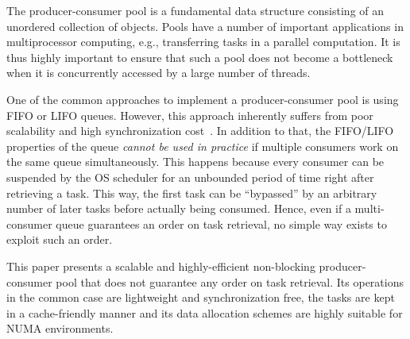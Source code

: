 The producer-consumer pool is a fundamental data structure consisting of an unordered collection of objects. Pools have a number of important
applications in multiprocessor computing, e.g., transferring tasks in a parallel computation. 
It is thus highly important to ensure that such a pool does not become a bottleneck when it is concurrently accessed 
by a large number of threads. 

One of the common approaches to implement a producer-consumer pool is using FIFO or LIFO queues. 
However, this approach inherently suffers from poor scalability and high synchronization cost~\cite{Afek:2010:SPP:1885276.1885295,Basin:2011:CST:2075029.2075087,Sundell:2011:LAC:1989493.1989550}. 
In addition to that, the FIFO/LIFO properties of the queue \emph{cannot be used in practice} if multiple consumers
work on the same queue simultaneously.
This happens because every consumer can be suspended by the OS scheduler for an unbounded period of time right after retrieving a task.
This way, the first task can be ``bypassed'' by an arbitrary number of later tasks before actually being consumed. 
Hence, even if a multi-consumer queue guarantees an order on task retrieval, no simple way exists to exploit such an order. 

This paper presents a scalable and highly-efficient non-blocking producer-consumer pool that does not guarantee any order on task retrieval.
Its operations in the common case are lightweight and synchronization free, the tasks are kept in a cache-friendly manner and its data allocation schemes are highly suitable for NUMA environments. 


